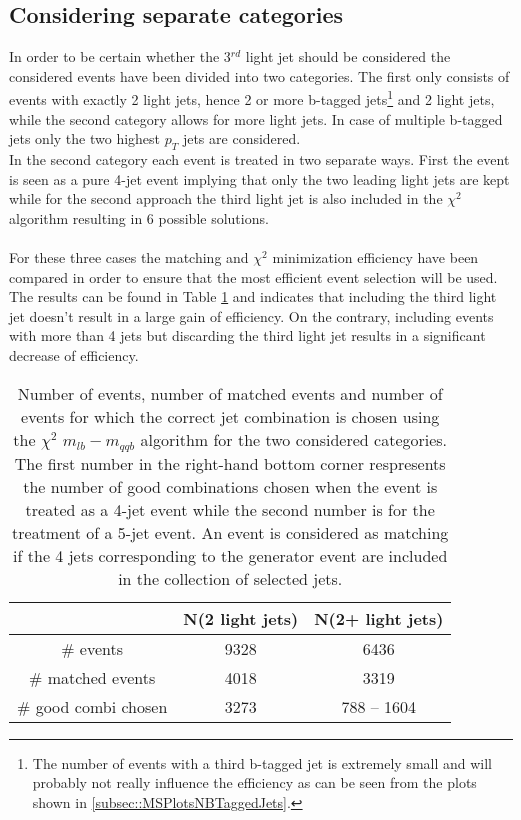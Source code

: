 \subsection{Considering separate categories}
In order to be certain whether the 3$^{rd}$ light jet should be considered the considered events have been divided into two categories. The first only consists of events with exactly 2 light jets, hence 2 or more b-tagged jets\footnote{The number of events with a third b-tagged jet is extremely small and will probably not really influence the efficiency as can be seen from the plots shown in \ref{subsec::MSPlotsNBTaggedJets}.} and 2 light jets, while the second category allows for more light jets. In case of multiple b-tagged jets only the two highest $p_T$ jets are considered.\\
In the second category each event is treated in two separate ways. First the event is seen as a pure 4-jet event implying that only the two leading light jets are kept while for the second approach the third light jet is also included in the $\chi^{2}$ algorithm resulting in 6 possible solutions.\\ \\
For these three cases the matching and $\chi^{2}$ minimization efficiency have been compared in order to ensure that the most efficient event selection will be used. The results can be found in Table \ref{table::LightJetCategories} and indicates that including the third light jet doesn't result in a large gain of efficiency. On the contrary, including events with more than 4 jets but discarding the third light jet results in a significant decrease of efficiency.

\begin{table}[!h]
 \centering
 \begin{tabular}{c|c|c}
                         & N(2 light jets) & N(2+ light jets)  \\
  \hline
  $\#$ events            & 9328            & 6436 \\
  $\#$ matched events    & 4018            & 3319 \\
  $\#$ good combi chosen & 3273            & 788 -- 1604
 \end{tabular}
 \caption{Number of events, number of matched events and number of events for which the correct jet combination is chosen using the $\chi^{2}$ $m_{lb} - m_{qqb}$ algorithm for the two considered categories. The first number in the right-hand bottom corner respresents the number of good combinations chosen when the event is treated as a 4-jet event while the second number is for the treatment of a 5-jet event. An event is considered as matching if the 4 jets corresponding to the generator event are included in the collection of selected jets.}\label{table::LightJetCategories}
\end{table}

